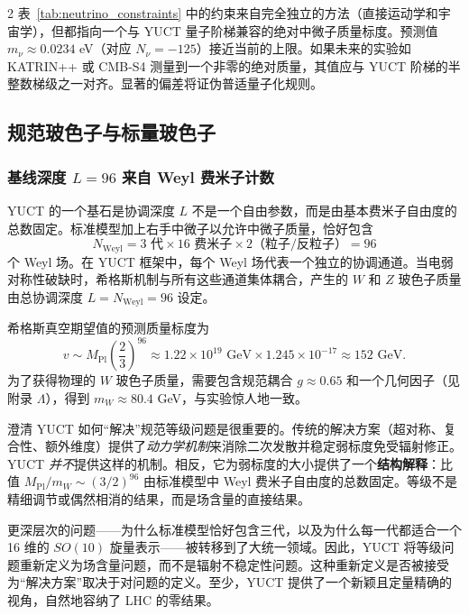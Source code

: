 \documentclass[11pt,a4paper]{article}
\begin{document}
\begin{multicols}{2}
		表~\ref{tab:neutrino_constraints} 中的约束来自完全独立的方法（直接运动学和宇宙学），但都指向一个与 YUCT 量子阶梯兼容的绝对中微子质量标度。预测值 $m_\nu \approx 0.0234$ eV（对应 $N_\nu = -125$）接近当前的上限。如果未来的实验如 KATRIN++ 或 CMB-S4 测量到一个非零的绝对质量，其值应与 YUCT 阶梯的半整数梯级之一对齐。显著的偏差将证伪普适量子化规则。
		
		\subsection{规范玻色子与标量玻色子}
		
		\subsubsection{基线深度 \(L=96\) 来自 Weyl 费米子计数}
		
		YUCT 的一个基石是协调深度 $L$ 不是一个自由参数，而是由基本费米子自由度的总数固定。标准模型加上右手中微子以允许中微子质量，恰好包含
		\scriptsize
		\[
		N_{\text{Weyl}} = 3 \text{ 代} \times 16 \text{ 费米子} \times 2 \text{（粒子/反粒子）} = 96
		\]
		\small
		个 Weyl 场。在 YUCT 框架中，每个 Weyl 场代表一个独立的协调通道。当电弱对称性破缺时，希格斯机制与所有这些通道集体耦合，产生的 $W$ 和 $Z$ 玻色子质量由总协调深度 $L = N_{\text{Weyl}} = 96$ 设定。
		
		希格斯真空期望值的预测质量标度为
		\begin{equation}
			v \sim M_{\mathrm{Pl}} \left( \frac{2}{3} \right)^{96} \approx 1.22 \times 10^{19} \text{ GeV} \times 1.245\times10^{-17} \approx 152 \text{ GeV}.
		\end{equation}
		为了获得物理的 $W$ 玻色子质量，需要包含规范耦合 $g \approx 0.65$ 和一个几何因子（见附录 $\Lambda$），得到 $m_W \approx 80.4$ GeV，与实验惊人地一致。
		
		澄清 YUCT 如何“解决”规范等级问题是很重要的。传统的解决方案（超对称、复合性、额外维度）提供了\textit{动力学机制}来消除二次发散并稳定弱标度免受辐射修正。YUCT \textit{并不}提供这样的机制。相反，它为弱标度的大小提供了一个\textbf{结构解释}：比值 \(M_{\mathrm{Pl}}/m_W \sim (3/2)^{96}\) 由标准模型中 Weyl 费米子自由度的总数固定。等级不是精细调节或偶然相消的结果，而是场含量的直接结果。
		
		更深层次的问题——为什么标准模型恰好包含三代，以及为什么每一代都适合一个 16 维的 \(SO(10)\) 旋量表示——被转移到了大统一领域。因此，YUCT 将等级问题重新定义为场含量问题，而不是辐射不稳定性问题。这种重新定义是否被接受为“解决方案”取决于对问题的定义。至少，YUCT 提供了一个新颖且定量精确的视角，自然地容纳了 LHC 的零结果。
		

\end{multicols}
\end{document}
